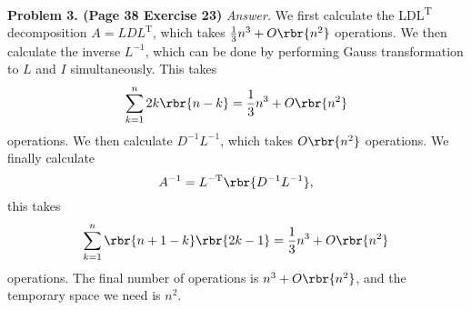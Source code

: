 \documentclass[english, nochinese]{pnote}
\begin{document}
\textbf{Problem 3. (Page 38 Exercise 23)} \textit{Answer.} We first calculate the LDL\textsuperscript{T} decomposition $ A = L D L^{\text{T}} $, which takes $ \frac{1}{3} n^3 + O \rbr{n^2} $ operations. We then calculate the inverse $L^{-1}$, which can be done by performing Gauss transformation to $L$ and $I$ simultaneously. This takes
\begin{equation}
\sum_{ k = 1 }^n 2 k \rbr{ n - k } = \frac{1}{3} n^3 + O \rbr{n^2}
\end{equation}
operations. We then calculate $ D^{-1} L^{-1} $, which takes $ O \rbr{n^2} $ operations. We finally calculate
\begin{equation}
A^{-1} = L^{-\text{T}} \rbr{ D^{-1} L^{-1} },
\end{equation}
this takes
\begin{equation}
\sum_{ k = 1 }^n \rbr{ n + 1 - k } \rbr{ 2 k - 1 } = \frac{1}{3} n^3 + O \rbr{n^2}
\end{equation}
operations. The final number of operations is $ n^3 + O \rbr{n^2} $, and the temporary space we need is $n^2$.
\end{document}
